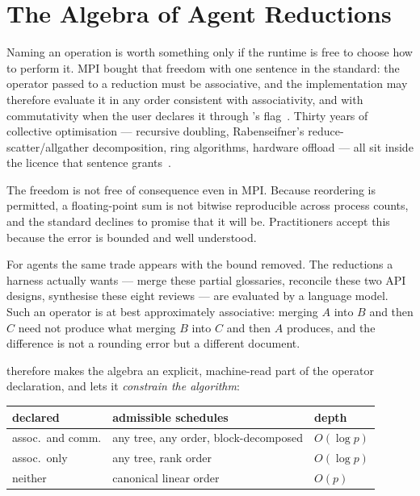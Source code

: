 
\section{The Algebra of Agent Reductions}
\label{sec:algebra}

Naming an operation  is worth something only if the runtime is
free to choose how to perform it.  MPI bought that freedom with one sentence in
the standard: the operator passed to a reduction must be associative, and the
implementation may therefore evaluate it in any order consistent with
associativity, and with commutativity when the user declares it through
's  flag~\cite{mpi41}.  Thirty years of
collective optimisation --- recursive doubling, Rabenseifner's
reduce-scatter/allgather decomposition, ring algorithms, hardware offload ---
all sit inside the licence that sentence grants~\cite{thakur2005collectives,
rabenseifner2004reduction,chan2007}.

The freedom is not free of consequence even in MPI.  Because reordering is
permitted, a floating-point sum is not bitwise reproducible across process
counts, and the standard declines to promise that it will be.  Practitioners
accept this because the error is bounded and well understood.

For agents the same trade appears with the bound removed.  The reductions a
harness actually wants --- merge these partial glossaries, reconcile these two
API designs, synthesise these eight reviews --- are evaluated by a language
model.  Such an operator is at best approximately associative: merging $A$ into
$B$ and then $C$ need not produce what merging $B$ into $C$ and then $A$
produces, and the difference is not a rounding error but a different document.

\ampi{} therefore makes the algebra an explicit, machine-read part of the
operator declaration, and lets it \emph{constrain the algorithm}:

\begin{center}
\begin{tabular}{@{}lll@{}}
\toprule
declared & admissible schedules & depth \\
\midrule
assoc.\ and comm. & any tree, any order, block-decomposed & $O(\log p)$ \\
assoc.\ only      & any tree, rank order                  & $O(\log p)$ \\
neither           & canonical linear order                & $O(p)$ \\
\bottomrule
\end{tabular}
\end{center}

